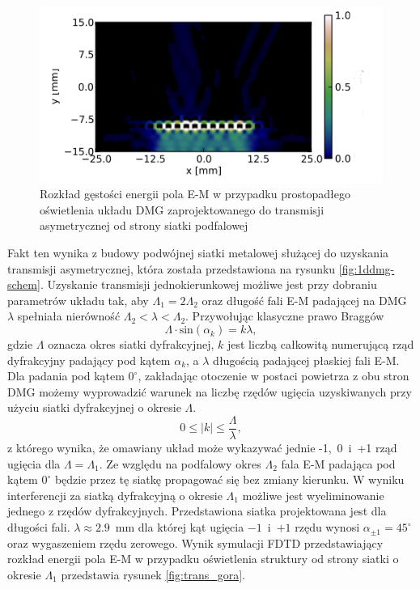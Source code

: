 \begin{figure}[tb]
	\includegraphics[width=\textwidth]{images/thz/opt_letters_dol.png}
	\caption{Rozkład gęstości energii pola E-M w przypadku prostopadłego oświetlenia układu DMG zaprojektowanego do transmisji asymetrycznej od strony siatki podfalowej \cite{Stolarek:13} }
	\label{fig:trans_dol}
\end{figure}

Fakt ten wynika z budowy podwójnej siatki metalowej służącej do uzyskania transmisji asymetrycznej, która została przedstawiona na rysunku \ref{fig:1ddmg-schem}. Uzyskanie transmisji jednokierunkowej możliwe jest przy dobraniu parametrów układu tak, aby $\Lambda_1 = 2\Lambda_2$ oraz długość fali E-M padającej na DMG  $\lambda$ spełniała nierówność $\Lambda_2<\lambda<\Lambda_2$. Przywołując klasyczne prawo Braggów
\begin{equation}
	\Lambda \cdot \textrm{sin}(\alpha_k) = k \lambda,
\end{equation}
gdzie $\Lambda$ oznacza okres siatki dyfrakcyjnej, $k$ jest liczbą całkowitą numerującą rząd dyfrakcyjny padający pod kątem $\alpha_k$, a $\lambda$ długością padającej płaskiej fali E-M. Dla padania pod kątem $0^{\circ}$, zakładając otoczenie w postaci powietrza z obu stron DMG możemy wyprowadzić warunek na liczbę rzędów ugięcia uzyskiwanych przy użyciu siatki dyfrakcyjnej o okresie $\Lambda$. 
\begin{equation}
	 0 \le |k| \le \frac { \Lambda }{\lambda},
\end{equation}
z którego wynika, że omawiany układ może wykazywać jednie -1,~0~i~+1 rząd ugięcia dla  $\Lambda=\Lambda_1$. Ze względu na podfalowy okres $\Lambda_2$ fala E-M padająca pod kątem $0^{\circ}$ będzie przez tę siatkę propagować się bez zmiany kierunku.  W wyniku interferencji za siatką dyfrakcyjną o okresie $\Lambda_1$ możliwe jest wyeliminowanie jednego z rzędów dyfrakcyjnych. Przedstawiona siatka projektowana jest dla długości fali. $\lambda \approx 2.9$~mm dla której kąt ugięcia $-1$~i~$+1$ rzędu wynosi $\alpha_{\pm 1} = 45^{\circ}$ oraz wygaszeniem rzędu zerowego. Wynik symulacji FDTD przedstawiający rozkład energii pola E-M w przypadku oświetlenia struktury od strony siatki o okresie $\Lambda_1$ przedstawia rysunek \ref{fig:trans_gora}.

